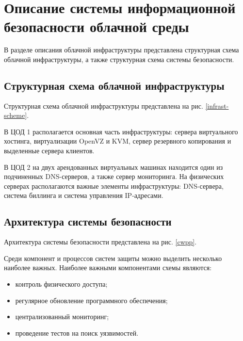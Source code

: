 \section{Описание системы информационной безопасности облачной среды}

В разделе описания облачной инфраструктуры представлена структурная схема облачной инфраструктуры, а также структурная схема системы безопасности.

\subsection{Структурная схема облачной инфраструктуры}

Структурная схема облачной инфраструктуры представлена на рис. \ref{infrast-scheme}.


В ЦОД 1 располагается основная часть инфраструктуры: сервера виртуального хостинга, виртуализации OpenVZ и KVM, сервер резервного копирования и выделенные сервера клиентов.

В ЦОД 2 на двух арендованных виртуальных машинах находится один из подчиненных DNS-серверов, а также сервер мониторинга.
На физических серверах располагаются важные элементы инфраструктуры: DNS-сервера, система биллинга и система управления IP-адресами.

\subsection{Архитектура системы безопасности}

Архитектура системы безопасности представлена на рис. \ref{cwpp}.


Среди компонент и процессов систем защиты можно выделить несколько наиболее важных.
Наиболее важными компонентами схемы являются:
\begin{itemize}
  \item контроль физического доступа;
  \item регулярное обновление программного обеспечения;
  \item централизованный мониторинг;
  \item проведение тестов на поиск уязвимостей.
\end{itemize}

\clearpage